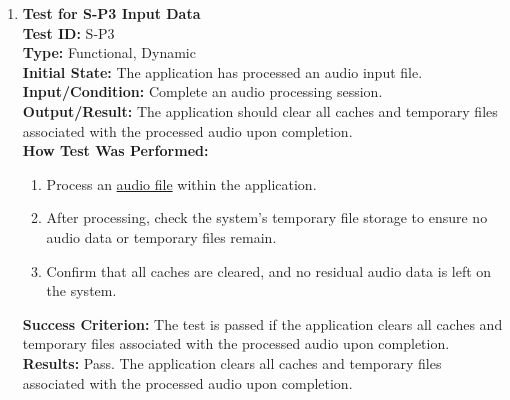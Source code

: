 \documentclass[12pt, titlepage]{article}
\begin{document}
\begin{enumerate}
    \item \textbf{Test for S-P3 Input Data} \\
      \newline
      \textbf{Test ID:} S-P3 \\
      \textbf{Type:} Functional, Dynamic \\
      \textbf{Initial State:} The application has processed an audio input file. \\
      \textbf{Input/Condition:} Complete an audio processing session. \\
      \textbf{Output/Result:} The application should clear all caches and temporary files associated with the processed 
      audio upon completion. \\
      \textbf{How Test Was Performed:}
      \begin{enumerate}
          \item Process an \href{https://github.com/emilyperica/ScoreGen/tree/main/test/TestingDatasets/piano-samples}{audio file} 
          within the application.
          \item After processing, check the system’s temporary file storage to ensure no audio data or temporary files remain.
          \item Confirm that all caches are cleared, and no residual audio data is left on the system.
      \end{enumerate}
      \textbf{Success Criterion:} The test is passed if the application clears all caches and temporary files associated with the processed audio upon completion.\\
      \textbf{Results:} Pass. The application clears all caches and temporary files associated with the processed audio upon completion.\\
\end{enumerate}
\end{document}
